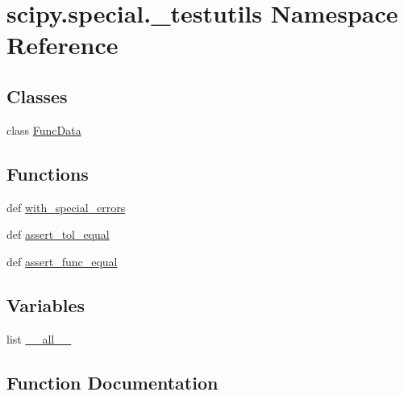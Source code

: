 \hypertarget{namespacescipy_1_1special_1_1__testutils}{}\section{scipy.\+special.\+\_\+testutils Namespace Reference}
\label{namespacescipy_1_1special_1_1__testutils}
\subsection*{Classes}
\begin{DoxyCompactItemize}
\item 
class \hyperlink{classscipy_1_1special_1_1__testutils_1_1FuncData}{Func\+Data}
\end{DoxyCompactItemize}
\subsection*{Functions}
\begin{DoxyCompactItemize}
\item 
def \hyperlink{namespacescipy_1_1special_1_1__testutils_a903beaa4b78274c7a6197e6d4fbd0847}{with\+\_\+special\+\_\+errors}
\item 
def \hyperlink{namespacescipy_1_1special_1_1__testutils_a94a08de99bdb8deb51610e24d94bfaff}{assert\+\_\+tol\+\_\+equal}
\item 
def \hyperlink{namespacescipy_1_1special_1_1__testutils_aaea4f1d4234ae6f8e7818c4092ec8809}{assert\+\_\+func\+\_\+equal}
\end{DoxyCompactItemize}
\subsection*{Variables}
\begin{DoxyCompactItemize}
\item 
list \hyperlink{namespacescipy_1_1special_1_1__testutils_a4808cd4ee42c4ce6c680df4ebcc72dfd}{\+\_\+\+\_\+all\+\_\+\+\_\+}
\end{DoxyCompactItemize}


\subsection{Function Documentation}
\hypertarget{namespacescipy_1_1special_1_1__testutils_aaea4f1d4234ae6f8e7818c4092ec8809}{}
